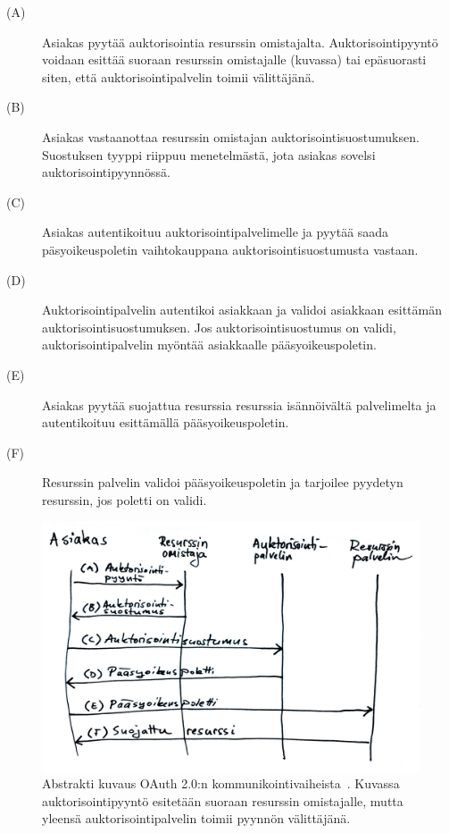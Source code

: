 \documentclass[finnish,gradu]{tktltiki}
\begin{document}
  \begin{description}
    \item[(A)]
      Asiakas pyytää auktorisointia resurssin omistajalta. Auktorisointipyyntö voidaan esittää suoraan resurssin omistajalle (kuvassa) tai epäsuorasti siten, että auktorisointipalvelin toimii välittäjänä.

    \item[(B)]
      Asiakas vastaanottaa resurssin omistajan auktorisointisuostumuksen. Suostuksen tyyppi riippuu menetelmästä, jota asiakas sovelsi auktorisointipyynnössä.

    \item[(C)]
      Asiakas autentikoituu auktorisointipalvelimelle ja pyytää saada päsyoikeuspoletin vaihtokauppana auktorisointisuostumusta vastaan.

    \item[(D)]
      Auktorisointipalvelin autentikoi asiakkaan ja validoi asiakkaan esittämän auktorisointisuostumuksen. Jos auktorisointisuostumus on validi, auktorisointipalvelin myöntää asiakkaalle pääsyoikeuspoletin.

    \item[(E)]
      Asiakas pyytää suojattua resurssia resurssia isännöivältä palvelimelta ja autentikoituu esittämällä pääsyoikeuspoletin.

    \item[(F)]
      Resurssin palvelin validoi pääsyoikeuspoletin ja tarjoilee pyydetyn resurssin, jos poletti on validi.
  \end{description}


  \begin{figure}[h!]
    \centering
    \includegraphics[width=1.0\textwidth]{images/oauth_abstract_flow.jpg}
    \caption{Abstrakti kuvaus OAuth 2.0:n kommunikointivaiheista~\cite{ietf_oauth2}. Kuvassa auktorisointipyyntö esitetään suoraan resurssin omistajalle, mutta yleensä auktorisointipalvelin toimii pyynnön välittäjänä.}
    \label{fig:oauth_abstract_flow}
  \end{figure}
\end{document}
